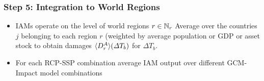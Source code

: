 \documentclass[
c,
11pt,
aspectratio=169, %
final,
]{beamer}
\begin{document}
\begin{frame}
  \frametitle{Step 5: Integration to World Regions}
  \begin{itemize}
  \item IAMs operate on the level of world regions $r\in\mathbb{N}_r$
    \arrowitem Average over the countries $j$ belonging to each region $r$ (weighted by average population or GDP or asset stock to obtain damages $\langle D^A_{r}\rangle(\Delta T_b)$ for $\Delta T_b$.
  \end{itemize}

  \begin{itemize}
  \item For each RCP-SSP combination average IAM output over different GCM-Impact model combinations
  \end{itemize}
  
\end{frame}
\end{document}
